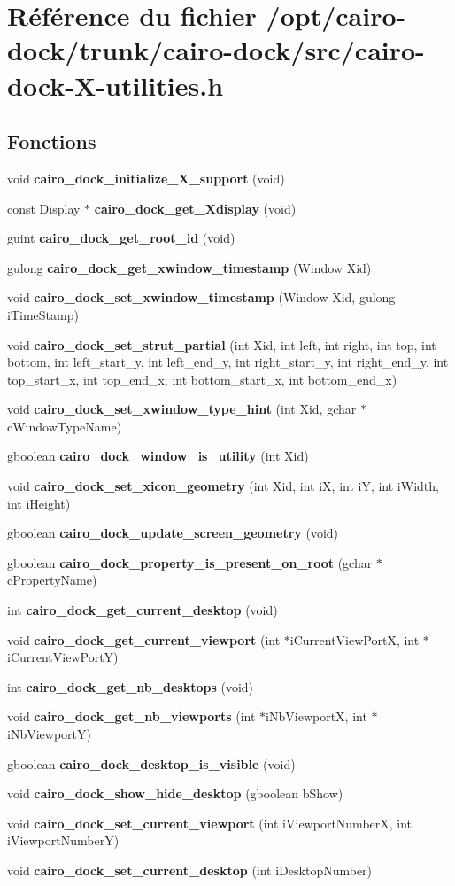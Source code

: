 \section{Référence du fichier /opt/cairo-dock/trunk/cairo-dock/src/cairo-dock-X-utilities.h}
\label{cairo-dock-X-utilities_8h}
\subsection*{Fonctions}
\begin{CompactItemize}
\item 
void {\bf cairo\_\-dock\_\-initialize\_\-X\_\-support} (void)
\item 
const Display $\ast$ {\bf cairo\_\-dock\_\-get\_\-Xdisplay} (void)
\item 
guint {\bf cairo\_\-dock\_\-get\_\-root\_\-id} (void)
\item 
gulong {\bf cairo\_\-dock\_\-get\_\-xwindow\_\-timestamp} (Window Xid)
\item 
void {\bf cairo\_\-dock\_\-set\_\-xwindow\_\-timestamp} (Window Xid, gulong iTimeStamp)
\item 
void {\bf cairo\_\-dock\_\-set\_\-strut\_\-partial} (int Xid, int left, int right, int top, int bottom, int left\_\-start\_\-y, int left\_\-end\_\-y, int right\_\-start\_\-y, int right\_\-end\_\-y, int top\_\-start\_\-x, int top\_\-end\_\-x, int bottom\_\-start\_\-x, int bottom\_\-end\_\-x)
\item 
void {\bf cairo\_\-dock\_\-set\_\-xwindow\_\-type\_\-hint} (int Xid, gchar $\ast$cWindowTypeName)
\item 
gboolean {\bf cairo\_\-dock\_\-window\_\-is\_\-utility} (int Xid)
\item 
void {\bf cairo\_\-dock\_\-set\_\-xicon\_\-geometry} (int Xid, int iX, int iY, int iWidth, int iHeight)
\item 
gboolean {\bf cairo\_\-dock\_\-update\_\-screen\_\-geometry} (void)
\item 
gboolean {\bf cairo\_\-dock\_\-property\_\-is\_\-present\_\-on\_\-root} (gchar $\ast$cPropertyName)
\item 
int {\bf cairo\_\-dock\_\-get\_\-current\_\-desktop} (void)
\item 
void {\bf cairo\_\-dock\_\-get\_\-current\_\-viewport} (int $\ast$iCurrentViewPortX, int $\ast$iCurrentViewPortY)
\item 
int {\bf cairo\_\-dock\_\-get\_\-nb\_\-desktops} (void)
\item 
void {\bf cairo\_\-dock\_\-get\_\-nb\_\-viewports} (int $\ast$iNbViewportX, int $\ast$iNbViewportY)
\item 
gboolean {\bf cairo\_\-dock\_\-desktop\_\-is\_\-visible} (void)
\item 
void {\bf cairo\_\-dock\_\-show\_\-hide\_\-desktop} (gboolean bShow)
\item 
void {\bf cairo\_\-dock\_\-set\_\-current\_\-viewport} (int iViewportNumberX, int iViewportNumberY)
\item 
void {\bf cairo\_\-dock\_\-set\_\-current\_\-desktop} (int iDesktopNumber)
\end{CompactItemize}



